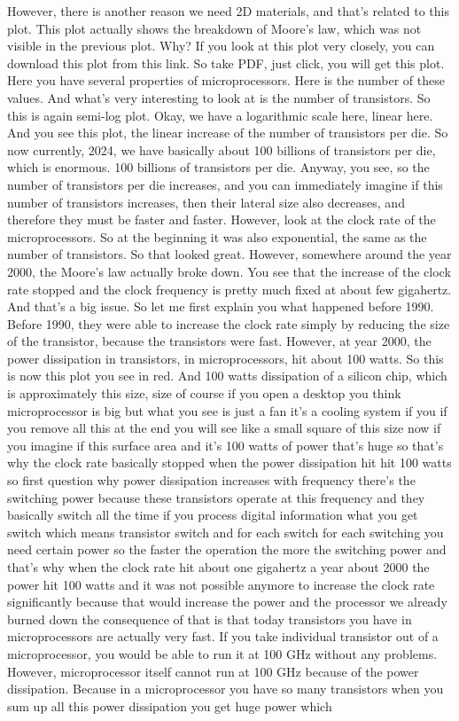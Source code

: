 However, there is another reason we need 2D materials, and that's related to this plot. This plot actually shows the breakdown of Moore's law, which was not visible in the previous plot. Why? If you look at this plot very closely, you can download this plot from this link. So take PDF, just click, you will get this plot. Here you have several properties of microprocessors. Here is the number of these values. And what's very interesting to look at is the number of transistors. So this is again semi-log plot. Okay, we have a logarithmic scale here, linear here. And you see this plot, the linear increase of the number of transistors per die. So now currently, 2024, we have basically about 100 billions of transistors per die, which is enormous. 100 billions of transistors per die. Anyway, you see, so the number of transistors per die increases, and you can immediately imagine if this number of transistors increases, then their lateral size also decreases, and therefore they must be faster and faster. However, look at the clock rate of the microprocessors. So at the beginning it was also exponential, the same as the number of transistors. So that looked great. However, somewhere around the year 2000, the Moore's law actually broke down. You see that the increase of the clock rate stopped and the clock frequency is pretty much fixed at about few gigahertz. And that's a big issue. So let me first explain you what happened before 1990. Before 1990, they were able to increase the clock rate simply by reducing the size of the transistor, because the transistors were fast. However, at year 2000, the power dissipation in transistors, in microprocessors, hit about 100 watts. So this is now this plot you see in red. And 100 watts dissipation of a silicon chip, which is approximately this size, size of course if you open a desktop you think microprocessor is big but what you see is just a fan it's a cooling system if you if you remove all this at the end you will see like a small square of this size now if you imagine if this surface area and it's 100 watts of power that's huge so that's why the clock rate basically stopped when the power dissipation hit hit 100 watts so first question why power dissipation increases with frequency there's the switching power because these transistors operate at this frequency and they basically switch all the time if you process digital information what you get switch which means transistor switch and for each switch for each switching you need certain power so the faster the operation the more the switching power and that's why when the clock rate hit about one gigahertz a year about 2000 the power hit 100 watts and it was not possible anymore to increase the clock rate significantly because that would increase the power and the processor we already burned down the consequence of that is that today transistors you have in microprocessors are actually very fast. If you take individual transistor out of a microprocessor, you would be able to run it at 100 GHz without any problems. However, microprocessor itself cannot run at 100 GHz because of the power dissipation. Because in a microprocessor you have so many transistors when you sum up all this power dissipation you get huge power which 